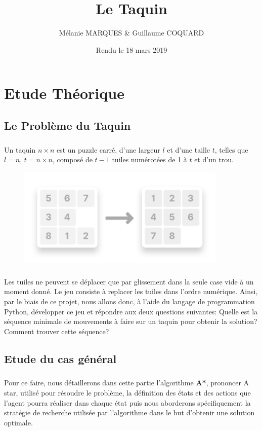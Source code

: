 \documentclass[10pt,a4paper]{report}
\title{\Huge{\textbf{Le Taquin}}}
\author{Mélanie MARQUES \& Guillaume COQUARD}
\date{Rendu le 18 mars 2019}
\begin{document}
\begin{titlepage}
\maketitle
\end{titlepage}
\chapter{Etude Théorique}
\section{Le Problème du Taquin}
\paragraph{} {Un taquin ${n \times n}$ est un puzzle carré, d'une largeur ${l}$ et d'une taille ${t}$, telles que ${l = n}$, ${t = n \times n}$, composé de ${t - 1}$ tuiles numérotées de 1 à ${t}$ et d’un trou.}
\begin{figure}[!h]
\centering
\includegraphics[keepaspectratio=true,width=10cm]{./inc/media/presentation_twoTaquins.pdf}
\end{figure}
\paragraph{} {Les tuiles ne peuvent se déplacer que par glissement dans la seule case vide à un moment donné. Le jeu consiste à replacer les tuiles dans l’ordre numérique. Ainsi, par le biais de ce projet, nous allons donc, à l'aide du langage de programmation {\ttfamily Python}, développer ce jeu et répondre aux deux questions suivantes: Quelle est la séquence minimale de mouvements à faire sur un taquin pour obtenir la solution? Comment trouver cette séquence?}
\section{Etude du cas général}
\paragraph{}{Pour ce faire, nous détaillerons dans cette partie l’algorithme \textbf{A*}, prononcer A star, utilisé pour résoudre le problème, la définition des états et des actions que l’agent pourra réaliser dans chaque état puis nous aborderons spécifiquement la stratégie de recherche utilisée par l’algorithme dans le but d'obtenir une solution optimale.}
\end{document}
